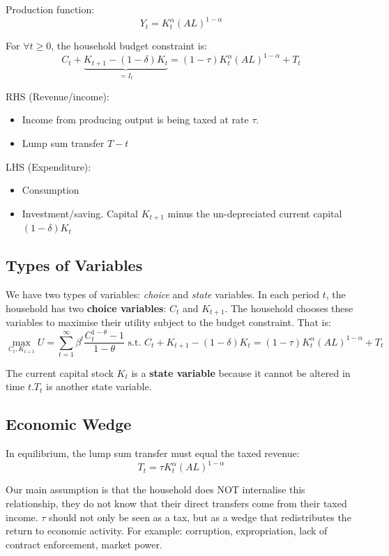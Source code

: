 \documentclass[11pt]{article}
\begin{document}
Production function: 
\[Y_t = K_t^\alpha (AL)^{1-\alpha}\]

For $\forall t \geq 0$, the household budget constraint is:
\[C_t + \underbrace{K_{t+1}-(1-\delta)K_t}_{=I_t} = (1-\tau)K_t^\alpha(AL)^{1-\alpha} + T_t\]

RHS (Revenue/income):
\begin{itemize}
    \item Income from producing output is being taxed at rate $\tau$.
    \item Lump sum transfer $T-t$
\end{itemize}

LHS (Expenditure):
\begin{itemize}
    \item Consumption
    \item Investment/saving. Capital $K_{t+1}$ minus the un-depreciated current capital $(1-\delta)K_t$
\end{itemize}

\subsection{Types of Variables}

We have two types of variables: \textit{choice} and \textit{state} variables. In each period $t$, the household has two \textbf{choice variables}: $C_t$ and $K_{t+1}$. The household chooses these variables to maximise their utility subject to the budget constraint. That is:
\[\mathop{max}_{C_t, K_{t+1}} U = \sum_{t=1}^\infty \beta^t \dfrac{C_t^{1-\theta}-1}{1-\theta} \text { s.t. } C_t + K_{t+1} - (1-\delta)K_t = (1-\tau)K_t^\alpha(AL)^{1-\alpha} + T_t\]

The current capital stock $K_t$ is a \textbf{state variable} because it cannot be altered in time $t$.$T_t$ is another state variable.

\subsection{Economic Wedge}

In equilibrium, the lump sum transfer must equal the taxed revenue:
\[T_t = \tau K_t^\alpha(AL)^{1-\alpha}\]

Our main assumption is that the household does NOT internalise this relationship, they do not know that their direct transfers come from their taxed income. $\tau$ should not only be seen as a tax, but as a wedge that redistributes the return to economic activity. For example: corruption, expropriation, lack of contract enforcement, market power.
\end{document}
